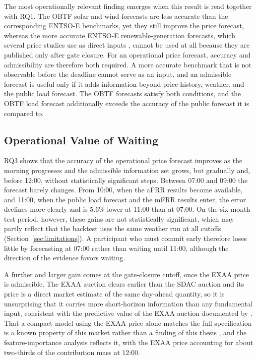 The most operationally relevant finding emerges when this result is read together
with RQ1. The OBTF solar and wind forecasts are less accurate than the
corresponding \mbox{ENTSO-E} benchmarks, yet they still improve the price
forecast, whereas the more accurate \mbox{ENTSO-E} renewable-generation forecasts,
which several price studies use as direct inputs
\cite{trebbien2023probabilistic,marcjasz2023distributional,hilger2024multivariate},
cannot be used at all because they are published only after gate closure. For
an operational price forecast, accuracy and admissibility are therefore both
required. A more accurate benchmark that is not observable before the deadline
cannot serve as an input, and an admissible forecast is useful only if it adds
information beyond price history, weather, and the public load forecast. The
OBTF forecasts satisfy both conditions, and the OBTF load forecast additionally exceeds the accuracy of the public forecast it is compared to.

\subsection{Operational Value of Waiting}

RQ3 shows that the accuracy of the operational price forecast improves as the
morning progresses and the admissible information set grows, but gradually and,
before 12:00, without statistically significant steps. Between 07:00 and 09:00
the forecast barely changes. From 10:00, when the aFRR results become available, and 11:00, when the public load
forecast and the mFRR results enter, the error
declines more clearly and is 5.6\% lower at 11:00 than at 07:00. On the
six-month test period, however, these gains are not statistically significant,
which may partly reflect that the backtest uses the same weather run at all
cutoffs (Section~\ref{sec:limitations}). A
participant who must commit early therefore loses little by forecasting at 07:00
rather than waiting until 11:00, although the direction of the evidence favors
waiting.

A further and larger gain comes at the gate-closure cutoff, once the EXAA price
is admissible. The EXAA auction clears earlier than the SDAC auction and its
price is a direct market estimate of the same day-ahead quantity, so it is
unsurprising that it carries more short-horizon information than any fundamental
input, consistent with the predictive value of the EXAA auction documented by
\textcite{ziel2015exaa}. That a compact model using the EXAA price alone matches
the full specification is a known property of this market rather than a finding
of this thesis \cite{eiser2026operational}, and the feature-importance analysis
reflects it, with the EXAA price accounting for about two-thirds of the
contribution mass at 12:00.

